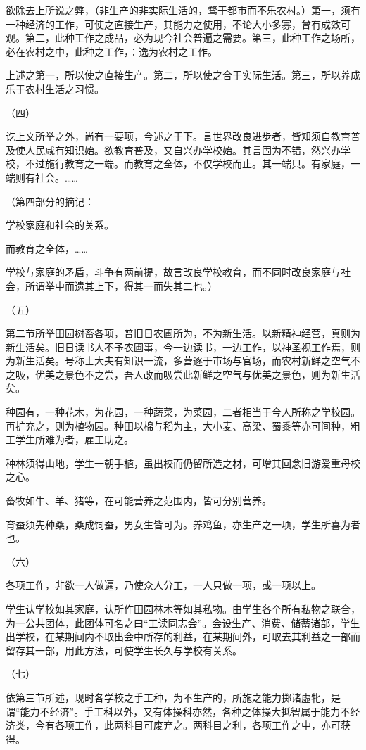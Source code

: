 欲除去上所说之弊，（非生产的非实际生活的，骛于都市而不乐农村。）第一，须有一种经济的工作，可使之直接生产，其能力之使用，不论大小多寡，曾有成效可观。第二，此种工作之成品，必为现今社会普遍之需要。第三，此种工作之场所，必在农村之中，此种之工作，：逸为农村之工作。

上述之第一，所以使之直接生产。第二，所以使之合于实际生活。第三，所以养成乐于农村生活之习惯。

（四）

讫上文所举之外，尚有一要项，今述之于下。言世界改良进步者，皆知须自教育普及使人民咸有知识始。欲教育普及，又自兴办学校始。其言固为不错，然兴办学校，不过施行教育之一端。而教育之全体，不仅学校而止。其一端只。有家庭，一端则有社会。……

（第四部分的摘记：

学校家庭和社会的关系。

而教育之全体，……

学校与家庭的矛盾，斗争有两前提，故言改良学校教育，而不同时改良家庭与社会，所谓举中而遗其上下，得其一而失其二也。）

（五）

第二节所举田园树畜各项，普旧日农圃所为，不为新生活。以新精神经营，真则为新生活矣。旧日读书人不予农圃事，今一边读书，一边工作，以神圣视工作焉，则为新生活矣。号称士大夫有知识一流，多营逐于市场与官场，而农村新鲜之空气不之吸，优美之景色不之尝，吾人改而吸尝此新鲜之空气与优美之景色，则为新生活矣。

种园有，一种花木，为花园，一种蔬菜，为菜园，二者相当于今人所称之学校园。再扩充之，则为植物园。种田以棉与稻为主，大小麦、高梁、蜀黍等亦可间种，粗工学生所难为者，雇工助之。

种林须得山地，学生一朝手植，虽出校而仍留所造之材，可增其回念旧游爱重母校之心。

畜牧如牛、羊、猪等，在可能营养之范围内，皆可分别营养。

育蚕须先种桑，桑成饲蚕，男女生皆可为。养鸡鱼，亦生产之一项，学生所喜为者也。

（六）

各项工作，非欲一人做遍，乃使众人分工，一人只做一项，或一项以上。

学生认学校如其家庭，认所作田园林木等如其私物。由学生各个所有私物之联合，为一公共团体，此团体可名之曰“工读同志会”。会设生产、消费、储蓄诸部，学生出学校，在某期间内不取出会中所存的利益，在某期间外，可取去其利益之一部而留存其一部，用此方法，可使学生长久与学校有关系。

（七）

依第三节所述，现时各学校之手工种，为不生产的，所施之能力掷诸虚牝，是谓“能力不经济”。手工科以外，又有体操科亦然，各种之体操大抵智属于能力不经济类，今有各项工作，此两科目可废弃之。两科目之利，各项工作之中，亦可获得。

